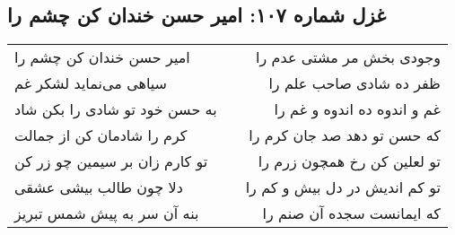 \begin{center}
\section*{غزل شماره ۱۰۷: امیر حسن خندان کن چشم را}
\label{sec:0107}
\begin{longtable}{l p{0.5cm} r}
امیر حسن خندان کن چشم را
&&
وجودی بخش مر مشتی عدم را
\\
سیاهی می‌نماید لشکر غم
&&
ظفر ده شادی صاحب علم را
\\
به حسن خود تو شادی را بکن شاد
&&
غم و اندوه ده اندوه و غم را
\\
کرم را شادمان کن از جمالت
&&
که حسن تو دهد صد جان کرم را
\\
تو کارم زان بر سیمین چو زر کن
&&
تو لعلین کن رخ همچون زرم را
\\
دلا چون طالب بیشی عشقی
&&
تو کم اندیش در دل بیش و کم را
\\
بنه آن سر به پیش شمس تبریز
&&
که ایمانست سجده آن صنم را
\\
\end{longtable}
\end{center}
